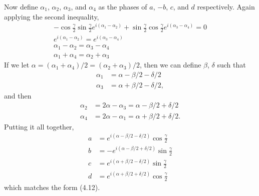 \documentclass[a4paper,12pt]{article}
\begin{document}
\begin{enumerate}
        Now define $\alpha_1$, $\alpha_2$, $\alpha_3$, and $\alpha_4$ as the phases of $a$, $-b$, $c$, and $d$ respectively. Again applying the second inequality,
        \begin{gather*}
            -\cos\frac{\gamma}{2} \sin\frac{\gamma}{2} e^{i(\alpha_1 - \alpha_2)} + \sin\frac{\gamma}{2} \cos\frac{\gamma}{2} e^{i(\alpha_3 - \alpha_4)} = 0 \\
            e^{i(\alpha_1 - \alpha_2)} = e^{i(\alpha_3 - \alpha_4)} \\
            \alpha_1 - \alpha_2 = \alpha_3 - \alpha_4 \\
            \alpha_1 + \alpha_4 = \alpha_2 + \alpha_3
        \end{gather*}
        If we let $\alpha = (\alpha_1 + \alpha_4) / 2 = (\alpha_2 + \alpha_3) / 2$, then we can define $\beta$, $\delta$ such that
        \begin{align*}
            \alpha_1 &= \alpha - \beta / 2 - \delta / 2 \\
            \alpha_3 &= \alpha + \beta / 2 - \delta / 2,
        \end{align*}
        and then
        \begin{align*}
            \alpha_2 &= 2\alpha - \alpha_3 = \alpha - \beta / 2 + \delta / 2 \\
            \alpha_4 &= 2\alpha - \alpha_1 = \alpha + \beta / 2 + \delta / 2.
        \end{align*}
        Putting it all together,
        \begin{align*}
            a &= e^{i(\alpha - \beta / 2 - \delta / 2)} \cos\frac{\gamma}{2} \\
            b &= -e^{i(\alpha - \beta / 2 + \delta / 2)} \sin\frac{\gamma}{2} \\
            c &= e^{i(\alpha + \beta / 2 - \delta / 2)} \sin\frac{\gamma}{2} \\
            d &= e^{i(\alpha + \beta / 2 + \delta / 2)} \cos\frac{\gamma}{2}
        \end{align*}
        which matches the form (4.12).


\end{enumerate}
\end{document}
